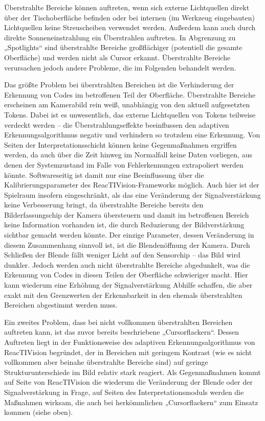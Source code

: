 Überstrahlte Bereiche können auftreten, wenn sich externe Lichtquellen direkt über der Tischoberfläche befinden oder bei internen (im Werkzeug eingebauten) Lichtquellen keine Streuscheiben verwendet werden. Außerdem kann auch durch direkte Sonneneinstrahlung ein Überstrahlen auftreten. In Abgrenzung zu „Spotlights“ sind überstrahlte Bereiche großflächiger (potentiell die gesamte Oberfläche) und werden nicht als Cursor erkannt. Überstrahlte Bereiche verursachen jedoch andere Probleme, die im Folgenden behandelt werden.

Das größte Problem bei überstrahlten Bereichen ist die Verhinderung der Erkennung von Codes im betroffenen Teil der Oberfläche. Überstrahlte Bereiche erscheinen am Kamerabild rein weiß, unabhängig von den aktuell aufgesetzten Tokens. Dabei ist es unwesentlich, das externe Lichtquellen von Tokens teilweise verdeckt werden -- die Überstrahlungseffekte beeinflussen den adaptiven Erkennungsalgorithmus negativ und verhindern so trotzdem eine Erkennung. Von Seiten der Interpretationsschicht können keine Gegenmaßnahmen ergriffen werden, da auch über die Zeit hinweg im Normalfall keine Daten vorliegen, aus denen der Systemzustand im Falle von Fehlerkennungen extrapoliert werden könnte. Softwareseitig ist damit nur eine Beeinflussung über die Kalibrierungsparameter des ReacTIVision-Frameworks möglich. Auch hier ist der Spielraum insofern eingeschränkt, als das eine Veränderung der Signalverstärkung keine Verbesserung bringt, da überstrahlte Bereiche bereits den Bilderfassungschip der Kamera übersteuern und damit im betroffenen Bereich keine Information vorhanden ist, die durch Reduzierung der Bildverstärkung sichtbar gemacht werden könnte. Der einzige Parameter, dessen Veränderung in diesem Zusammenhang sinnvoll ist, ist die Blendenöffnung der Kamera. Durch Schließen der Blende fällt weniger Licht auf den Sensorchip -- das Bild wird dunkler. Jedoch werden auch nicht überstrahlte Bereiche abgedunkelt, was die Erkennung von Codes in diesen Teilen der Oberfläche schwieriger macht. Hier kann wiederum eine Erhöhung der Signalverstärkung Abhilfe schaffen, die aber exakt mit den Grenzwerten der Erkennbarkeit in den ehemals überstrahlten Bereichen abgestimmt werden muss.

Ein zweites Problem, dass bei nicht vollkommen überstrahlten Bereichen auftreten kann, ist das zuvor bereits beschriebene „Cursorflackern“. Dessen Auftreten liegt in der Funktionsweise des adaptiven Erkennungsalgorithmus von ReacTIVision begründet, der in Bereichen mit geringem Kontrast (wie es nicht vollkommen aber beinahe überstrahlte Bereiche sind) auf geringe Strukturunterschiede im Bild relativ stark reagiert. Als Gegenmaßnahmen kommt auf Seite von ReacTIVision die wiederum die Veränderung der Blende oder der Signalverstärkung in Frage, auf Seiten des Interpretationsmoduls werden die Maßnahmen wirksam, die auch bei herkömmlichen „Cursorflackern“ zum Einsatz kommen (siehe oben).


